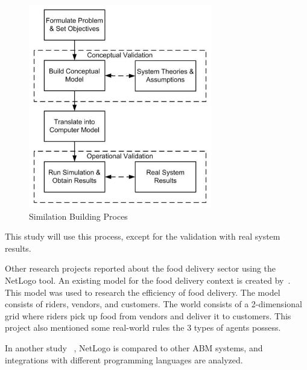 \begin{figure}
    \centering
    \includegraphics[width=8cm]{sections/pics/Steps_To_Build_Simulation}
    \caption{Similation Building Proces}
    \label{fig:steps_simulation}
\end{figure}

This study will use this process, except for the validation with real system results.

Other research projects reported about the food delivery sector using the NetLogo tool.
An existing model for the food delivery context is created by~\cite{ismail2024software}.
This model was used to research the efficiency of food delivery.
The model consists of riders, vendors, and customers.
The world consists of a 2-dimensional grid where riders pick up food from vendors and deliver it to customers.
This project also mentioned some real-world rules the 3 types of agents possess.

In another study ~\cite{antelmi2024reliable}, NetLogo is compared to other ABM systems, and integrations with different programming languages are analyzed.




